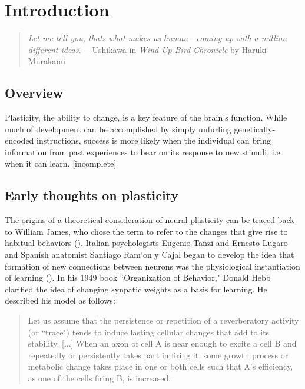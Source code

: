\chapter{Introduction}

\begin{quotation}
\textit{Let me tell you, thats what makes us human---coming up with a million \mbox{different} ideas.}
\newline{}
\newline{}
 ---Ushikawa in \textit{Wind-Up Bird Chronicle} by Haruki Murakami
\end{quotation}

\section{Overview}

Plasticity, the ability to change, is a key feature of the brain's function. While much of development can be accomplished by simply unfurling genetically-encoded instructions, success is more likely when the individual can bring information from past experiences to bear on its response to new stimuli, i.e. when it can learn. [incomplete]

\section{Early thoughts on plasticity}
The origins of a theoretical consideration of neural plasticity can be traced back to William James, who chose the term to refer to the changes that give rise to habitual behaviors (\cite{James1910, Berlucchi2009}). Italian psychologists Eugenio Tanzi and Ernesto Lugaro and Spanish anatomist Santiago Ram\a`on y Cajal began to develop the idea that formation of new connections between neurons was the physiological instantiation of learning (\cite{Berlucchi2009}). In his 1949 book ``Organization of Behavior," Donald Hebb clarified the idea of changing synpatic weights as a basis for learning. He described his model as follows:

\begin{quotation}
Let us assume that the persistence or repetition of a reverberatory activity (or ``trace") tends to induce lasting cellular changes that add to its stability. [...] When an axon of cell A is near enough to excite a cell B and repeatedly or persistently takes part in firing it, some growth process or metabolic change takes place in one or both cells such that A's efficiency, as one of the cells firing B, is increased.
\end{quotation}

